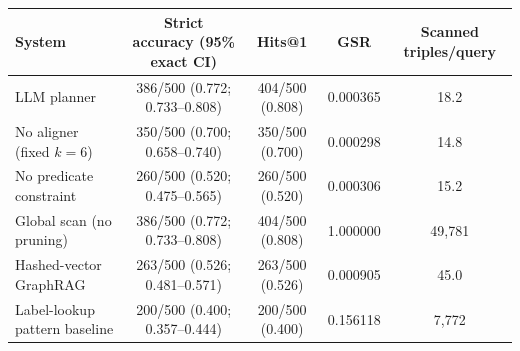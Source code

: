 \begin{tabular}{lcccc}
\toprule
System & Strict accuracy (95\% exact CI) & Hits@1 & GSR & Scanned triples/query \\
\midrule
LLM planner & 386/500 (0.772; 0.733--0.808) & 404/500 (0.808) & 0.000365 & 18.2 \\
No aligner (fixed $k=6$) & 350/500 (0.700; 0.658--0.740) & 350/500 (0.700) & 0.000298 & 14.8 \\
No predicate constraint & 260/500 (0.520; 0.475--0.565) & 260/500 (0.520) & 0.000306 & 15.2 \\
Global scan (no pruning) & 386/500 (0.772; 0.733--0.808) & 404/500 (0.808) & 1.000000 & 49,781 \\
Hashed-vector GraphRAG & 263/500 (0.526; 0.481--0.571) & 263/500 (0.526) & 0.000905 & 45.0 \\
Label-lookup pattern baseline & 200/500 (0.400; 0.357--0.444) & 200/500 (0.400) & 0.156118 & 7,772 \\
\bottomrule
\end{tabular}
